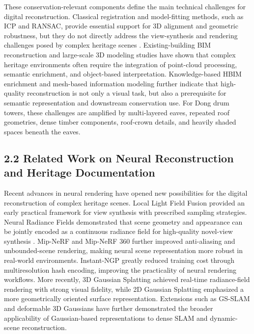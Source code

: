 These conservation-relevant components define the main technical
challenges for digital reconstruction. Classical registration and
model-fitting methods, such as ICP and RANSAC, provide essential support
for 3D alignment and geometric robustness, but they do not directly
address the view-synthesis and rendering challenges posed by complex
heritage scenes	\cite{besl1992icp,fischler1981ransac}. Existing-building BIM reconstruction and
large-scale 3D modeling studies have shown that complex heritage
environments often require the integration of point-cloud processing,
semantic enrichment, and object-based interpretation\cite{tang2010automatic,volk2014bim,fassi2013comparison}.
Knowledge-based HBIM enrichment and mesh-based information modeling
further indicate that high-quality reconstruction is not only a visual
task, but also a prerequisite for semantic representation and downstream
conservation use\cite{quattrini2017knowledge,yang2019hbim}. For Dong drum towers, these challenges are
amplified by multi-layered eaves, repeated roof geometries, dense timber
components, roof-crown details, and heavily shaded spaces beneath the
eaves.

\subsection{2.2 Related Work on Neural Reconstruction and Heritage
Documentation}\label{related-work-on-neural-reconstruction-and-heritage-documentation}

Recent advances in neural rendering have opened new possibilities for
the digital reconstruction of complex heritage scenes. Local Light Field
Fusion provided an early practical framework for view synthesis with
prescribed sampling strategies\cite{mildenhall2019llff}. Neural Radiance Fields
demonstrated that scene geometry and appearance can be jointly encoded
as a continuous radiance field for high-quality novel-view synthesis
\cite{mildenhall2022nerf}. Mip-NeRF and Mip-NeRF 360 further improved anti-aliasing and
unbounded-scene rendering, making neural scene representation more
robust in real-world environments\cite{barron2021mipnerf,barron2022mipnerf360}. Instant-NGP greatly
reduced training cost through multiresolution hash encoding, improving
the practicality of neural rendering workflows\cite{muller2022instantngp}. More recently,
3D Gaussian Splatting achieved real-time radiance-field rendering with
strong visual fidelity\cite{kerbl2023gaussiansplatting}, while 2D Gaussian Splatting emphasized
a more geometrically oriented surface representation\cite{huang2024_2dgs}.
Extensions such as GS-SLAM and deformable 3D Gaussians have further
demonstrated the broader applicability of Gaussian-based representations
to dense SLAM and dynamic-scene reconstruction\cite{yan2024gsslam,yang2024deformable3dgs}.

